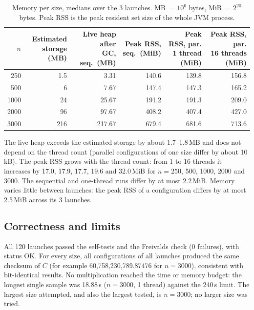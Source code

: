\documentclass[11pt,a4paper]{article}
\begin{document}
\begin{table}[H]
\centering\small
\caption{Memory per size, medians over the 3 launches. MB $= 10^6$ bytes, MiB $= 2^{20}$ bytes. Peak RSS is the peak resident set size of the whole JVM process.}\label{tab:memory}
\begin{tabular}{@{}rrrrrr@{}}
\toprule
$n$ & \shortstack{Estimated\\storage (MB)} & \shortstack{Live heap after\\GC, seq.\ (MB)} & \shortstack{Peak RSS,\\seq.\ (MiB)} & \shortstack{Peak RSS, par.\\1 thread (MiB)} & \shortstack{Peak RSS, par.\\16 threads (MiB)} \\
\midrule
250 & 1.5 & 3.31 & 140.6 & 139.8 & 156.8 \\
500 & 6 & 7.67 & 147.4 & 147.3 & 165.2 \\
1000 & 24 & 25.67 & 191.2 & 191.3 & 209.0 \\
2000 & 96 & 97.67 & 408.2 & 407.4 & 427.0 \\
3000 & 216 & 217.67 & 679.4 & 681.6 & 713.6 \\
\bottomrule
\end{tabular}
\end{table}

The live heap exceeds the estimated storage by about 1.7--1.8\,MB and does not depend on the thread count (parallel configurations of one size differ by about 10\,kB). The peak RSS grows with the thread count: from 1 to 16 threads it increases by 17.0, 17.9, 17.7, 19.6 and 32.0\,MiB for $n = 250$, 500, 1000, 2000 and 3000. The sequential and one-thread runs differ by at most 2.2\,MiB. Memory varies little between launches: the peak RSS of a configuration differs by at most 2.5\,MiB across its 3 launches.

\subsection{Correctness and limits}

All 120 launches passed the self-tests and the Freivalds check (0 failures), with status OK. For every size, all configurations of all launches produced the same checksum of $C$ (for example 60,758,230,789.87476 for $n = 3000$), consistent with bit-identical results. No multiplication reached the time or memory budget: the longest single sample was 18.88\,s ($n = 3000$, 1 thread) against the 240\,s limit. The largest size attempted, and also the largest tested, is $n = 3000$; no larger size was tried.
\end{document}
